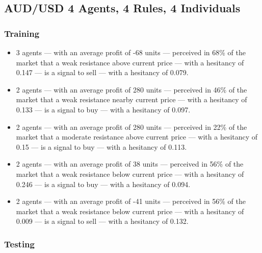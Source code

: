 \subsection{AUD/USD 4 Agents, 4 Rules, 4 Individuals}
\label{}

\subsubsection{Training}
\label{}

{\scriptsize
  \begin{itemize}
  \item 3 agents — with an average profit of -68 units — perceived in 68\% of
    the market that a weak resistance above current price — with a hesitancy of
    0.147 — is a signal to sell — with a hesitancy of 0.079.
  \item 2 agents — with an average profit of 280 units — perceived in 46\% of
    the market that a weak resistance nearby current price — with a hesitancy of
    0.133 — is a signal to buy — with a hesitancy of 0.097.
  \item 2 agents — with an average profit of 280 units — perceived in 22\% of
    the market that a moderate resistance above current price — with a hesitancy
    of 0.15 — is a signal to buy — with a hesitancy of 0.113.
  \item 2 agents — with an average profit of 38 units — perceived in 56\% of the
    market that a weak resistance below current price — with a hesitancy of
    0.246 — is a signal to buy — with a hesitancy of 0.094.
  \item 2 agents — with an average profit of -41 units — perceived in 56\% of
    the market that a weak resistance below current price — with a hesitancy of
    0.009 — is a signal to sell — with a hesitancy of 0.132.
  \end{itemize}
}

\subsubsection{Testing}
\label{}

